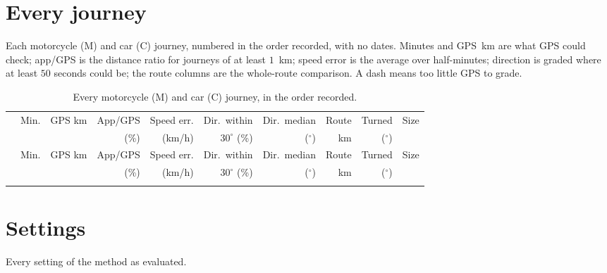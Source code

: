 \documentclass[11pt]{article}
\newcommand{\dg}{^\circ}
\begin{document}
\appendix

\section{Every journey}\label{app:journeys}

Each motorcycle (M) and car (C) journey, numbered in the order recorded, with no dates. Minutes and GPS~km are
what GPS could check; app/GPS is the distance ratio for journeys of at least $1$~km; speed error is the
average over half-minutes; direction is graded where at least $50$ seconds could be; the route columns
are the whole-route comparison. A dash means too little GPS to grade.

{\small\setlength{\tabcolsep}{5pt}
\begin{longtable}{lrrrrrrrrr}
\caption{Every motorcycle (M) and car (C) journey, in the order recorded.}\label{tab:journeys}\\
\toprule
 & Min. & GPS km & App/GPS & Speed err. & Dir.\ within & Dir.\ median & Route & Turned & Size\\
 & & & (\%) & (km/h) & $30\dg$ (\%) & ($\dg$) & km & ($\dg$) & \\
\midrule
\endfirsthead
\toprule
 & Min. & GPS km & App/GPS & Speed err. & Dir.\ within & Dir.\ median & Route & Turned & Size\\
 & & & (\%) & (km/h) & $30\dg$ (\%) & ($\dg$) & km & ($\dg$) & \\
\midrule
\endhead
\bottomrule
\endfoot

\end{longtable}}

\section{Settings}\label{app:params}

\begin{table}[H]
\centering\small
\caption{Every setting of the method as evaluated.}
\label{tab:params}

\end{table}
\end{document}
